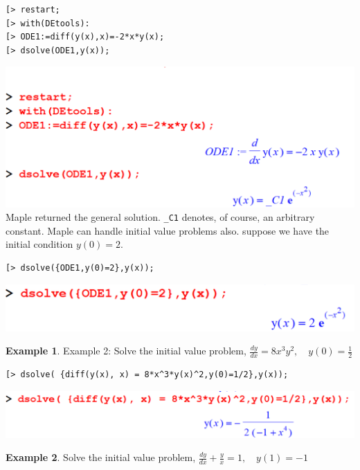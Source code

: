 \documentclass[
]{book}
\theoremstyle{definition}
\theoremstyle{definition}
\newtheorem{example}{Example}[chapter]
\theoremstyle{definition}
\theoremstyle{definition}
\theoremstyle{remark}
\begin{document}
\begin{verbatim}
[> restart; 
[> with(DEtools):
[> ODE1:=diff(y(x),x)=-2*x*y(x);
[> dsolve(ODE1,y(x));
\end{verbatim}

\includegraphics{figures/Diff/Diff 6.2 -6.png}
Maple returned the general solution. \texttt{\_C1} denotes, of course, an arbitrary constant.
Maple can handle initial value problems also. suppose we have the initial condition \(y(0)=2\).

\begin{verbatim}
[> dsolve({ODE1,y(0)=2},y(x));
\end{verbatim}

\includegraphics{figures/Diff/Diff 6.2 -7.png}

\begin{example}
\protect\hypertarget{exm:unnamed-chunk-33}{}\label{exm:unnamed-chunk-33}Example 2: Solve the initial value problem,
\(\frac{dy}{dx} = 8x^3y^2, \quad y(0) = \frac{1}{2}\)
\end{example}

\begin{verbatim}
[> dsolve( {diff(y(x), x) = 8*x^3*y(x)^2,y(0)=1/2},y(x));
\end{verbatim}

\includegraphics{figures/Diff/Diff 6.2 -8.png}

\begin{example}
\protect\hypertarget{exm:unnamed-chunk-34}{}\label{exm:unnamed-chunk-34}Solve the initial value problem, \(\frac{dy}{dx} + \frac{y}{x} = 1, \quad y(1) = -1\)
\end{example}
\end{document}
